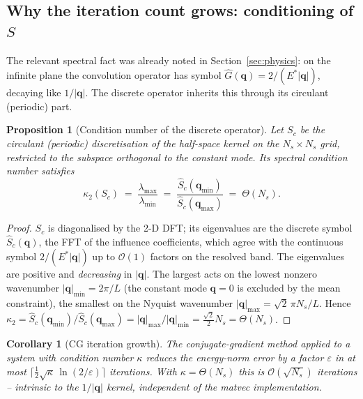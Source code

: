 \documentclass[11pt,a4paper]{article}
\newcommand{\Es}{E^{*}}
\newcommand{\Order}{\mathcal{O}}
\newcommand{\abs}[1]{\left\lvert #1 \right\rvert}
\newtheorem{proposition}{Proposition}
\newtheorem{corollary}{Corollary}
\theoremstyle{definition}
\theoremstyle{remark}
\begin{document}
\subsection{Why the iteration count grows: conditioning of $S$}
\label{sec:cond}

The relevant spectral fact was already noted in Section~\ref{sec:physics}: on the
infinite plane the convolution operator has symbol
$\widehat G(\mathbf q)=2/(\Es\abs{\mathbf q})$, decaying like $1/\abs{\mathbf q}$.
The discrete operator inherits this through its circulant (periodic) part.

\begin{proposition}[Condition number of the discrete operator]
\label{prop:cond}
Let $S_c$ be the circulant (periodic) discretisation of the half-space kernel on
the $N_s\times N_s$ grid, restricted to the subspace orthogonal to the constant
mode. Its spectral condition number satisfies
\begin{equation}
  \kappa_2(S_c) \;=\; \frac{\lambda_{\max}}{\lambda_{\min}}
  \;=\; \frac{\widehat S_c(\mathbf q_{\min})}{\widehat S_c(\mathbf q_{\max})}
  \;=\; \Theta(N_s).
  \label{eq:kappa}
\end{equation}
\end{proposition}
\begin{proof}
$S_c$ is diagonalised by the 2-D DFT; its eigenvalues are the discrete symbol
$\widehat S_c(\mathbf q)$, the FFT of the influence coefficients, which agree with
the continuous symbol $2/(\Es\abs{\mathbf q})$ up to $\Order(1)$ factors on the
resolved band. The eigenvalues are positive and \emph{decreasing} in
$\abs{\mathbf q}$. The largest acts on the lowest nonzero wavenumber
$\abs{\mathbf q}_{\min}=2\pi/L$ (the constant mode $\mathbf q=0$ is excluded by the
mean constraint), the smallest on the Nyquist wavenumber
$\abs{\mathbf q}_{\max}=\sqrt2\,\pi N_s/L$. Hence
$\kappa_2 = \widehat S_c(\mathbf q_{\min})/\widehat S_c(\mathbf q_{\max})
= \abs{\mathbf q}_{\max}/\abs{\mathbf q}_{\min} = \tfrac{\sqrt2}{2}N_s=\Theta(N_s)$.
\end{proof}

\begin{corollary}[CG iteration growth]
\label{cor:cg}
The conjugate-gradient method applied to a system with condition number $\kappa$
reduces the energy-norm error by a factor $\varepsilon$ in at most
$\big\lceil \tfrac12\sqrt{\kappa}\,\ln(2/\varepsilon)\big\rceil$ iterations. With
$\kappa=\Theta(N_s)$ this is $\Order(\sqrt{N_s})$ iterations -- intrinsic to the
$1/\abs{\mathbf q}$ kernel, independent of the matvec implementation.
\end{corollary}
\end{document}
